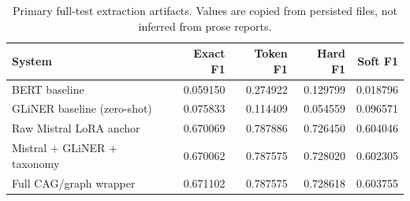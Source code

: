 \begin{table}[H]
\centering
\small
\caption{Primary full-test extraction artifacts. Values are copied from persisted  files, not inferred from prose reports.}
\label{tab:main-results}
\begin{tabular}{lrrrr}
\toprule
System & Exact F1 & Token F1 & Hard F1 & Soft F1 \\
\midrule
BERT baseline & 0.059150 & 0.274922 & 0.129799 & 0.018796 \\
GLiNER baseline (zero-shot) & 0.075833 & 0.114409 & 0.054559 & 0.096571 \\
Raw Mistral LoRA anchor & 0.670069 & 0.787886 & 0.726450 & 0.604046 \\
Mistral + GLiNER + taxonomy & 0.670062 & 0.787575 & 0.728020 & 0.602305 \\
Full CAG/graph wrapper & 0.671102 & 0.787575 & 0.728618 & 0.603755 \\
\bottomrule
\end{tabular}
\end{table}
